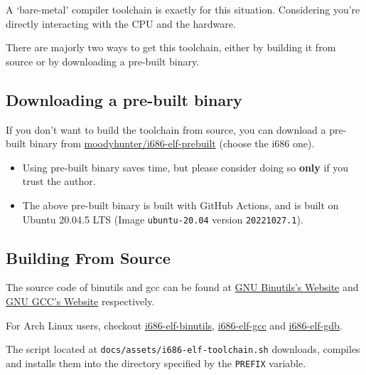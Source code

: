 A `bare-metal' compiler toolchain is exactly for this situation. Considering you're
directly interacting with the CPU and the hardware.

There are majorly two ways to get this toolchain, either by building it from source
or by downloading a pre-built binary.

\subsection{Downloading a pre-built binary}

If you don't want to build the toolchain from source, you can download a pre-built
binary from \href{https://github.com/moodyhunter/i686-elf-prebuilt/releases}{moodyhunter/i686-elf-prebuilt} (choose the i686 one).

\begin{warning}
    \begin{itemize}
        \item Using pre-built binary saves time, but please consider doing so \textbf{only} if you trust the author.
        \item The above pre-built binary is built with GitHub Actions, and is built on Ubuntu 20.04.5 LTS (Image \texttt{ubuntu-20.04} version \texttt{20221027.1}).
    \end{itemize}
\end{warning}

\subsection{Building From Source}

The source code of binutils and gcc can be found at \href{https://www.gnu.org/software/binutils}{GNU Binutils's Website}
and \href{https://gcc.gnu.org}{GNU GCC's Website} respectively.

\begin{note}
    For Arch Linux users, checkout
    \href{https://github.com/moodyhunter/repo/blob/main/moody/i686-elf-binutils/PKGBUILD}{i686-elf-binutils},
    \href{https://github.com/moodyhunter/repo/blob/main/moody/i686-elf-gcc/PKGBUILD}{i686-elf-gcc} and
    \href{https://github.com/moodyhunter/repo/blob/main/moody/i686-elf-gdb/PKGBUILD}{i686-elf-gdb}.
\end{note}

The script located at \texttt{docs/assets/i686-elf-toolchain.sh} downloads, compiles and installs them into the
directory specified by the \texttt{PREFIX} variable.

